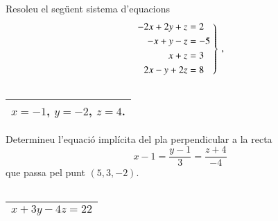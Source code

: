 \documentclass[11pt,catalan]{article}
\begin{document}
\begin{enunciat}
Resoleu el següent sistema d'equacions
\[
  \left.\aligned - 2 x + 2 y + z &= 2 \\ - x + y - z &= -5 \\ x + z &= 3 \\ 2 x - y + 2 z &= 8 \endaligned\;\right\}\,,
\]
\end{enunciat}

\begin{quadricula}
\begin{tabular}{|C{5cm}{0.5cm}|}
\hline
  \\
\hline
\end{tabular}
\end{quadricula}

\begin{solucio}
\begin{center}
\begin{tabular}{|C{5cm}{0.5cm}|}
\hline
$x=-1$, $y=-2$, $z=4$. \\
\hline
\end{tabular}
\end{center}
\end{solucio}


\begin{enunciat}
Determineu l'equació implícita del pla perpendicular a la recta 
\[
  x - 1 = \frac{y - 1}{3} = \frac{z + 4}{-4}
\]
que passa pel punt $(5,3,-2)$.
\end{enunciat}

\begin{quadricula}
\begin{tabular}{|C{5cm}{0.5cm}|}
\hline
  \\
\hline
\end{tabular}
\end{quadricula}

\begin{solucio}
\begin{center}
\begin{tabular}{|C{5cm}{0.5cm}|}
\hline
$x + 3 y - 4 z = 22$ \\
\hline
\end{tabular}
\end{center}
\end{solucio}
\end{document}
